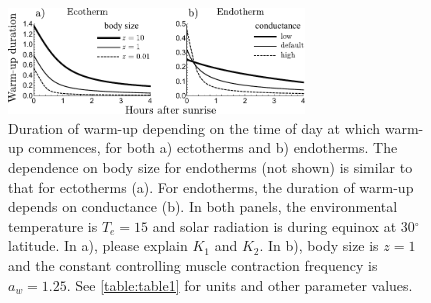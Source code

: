 \clearpage

\begin{figure}[H]
\centering \includegraphics[width=0.7\textwidth]{fig4}
\caption{
    \setstretch{\stretchby}
    Duration of warm-up depending on the time of day at which warm-up commences, for both a) ectotherms and b) endotherms.
    The dependence on body size for endotherms (not shown) is similar to that for ectotherms (a).
    For endotherms, the duration of warm-up depends on conductance (b).
	In both panels, the environmental temperature is $T_e = 15$ and solar radiation is during equinox at 30$^\circ$ latitude.
    In a), please explain $K_1$ and $K_2$.  %
    In b), body size is $z = 1$ and the constant controlling muscle contraction frequency is $a_w = 1.25$.
	See \cref{table:table1} for units and other parameter values.
}
\label{fig4}
\end{figure}

\clearpage

